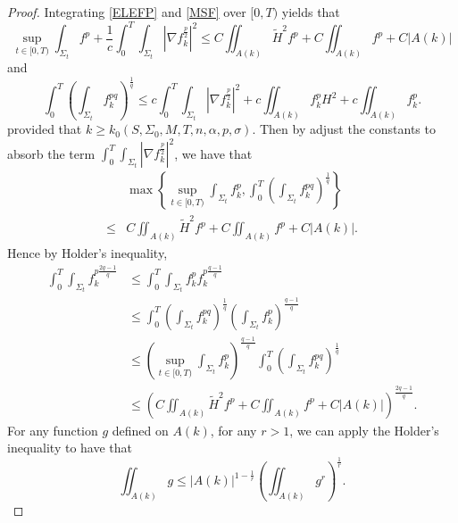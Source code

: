 \begin{proof}
    Integrating \autoref{ELEFP} and \autoref{MSF} over $[0,T)$ yields that 
    \begin{equation*}
        \sup _{t \in [0,T)} \int_{\Sigma_t} f^p + \frac{1}{c} \int_{0}^{T}\int_{\Sigma_t} \left| \nabla f_{k}^{\frac{p}{2}}  \right| ^2 \leq C \iint_{A(k)}^{} \tilde{H}^2 f^p +C \iint_{A(k)}^{}f^p + C \left| A(k) \right| 
    \end{equation*}
    and
    \begin{equation*}
        \int_{0}^{T} \left(\int_{\Sigma_t} f_{k}^{pq} \right) ^{\frac{1}{q}} \leq c \int_{0}^{T}\int_{\Sigma_t} \left| \nabla f_{k}^{\frac{p}{2}} \right| ^2 + c \iint_{A(k)} f_{k}^{p} H^2 + c \iint_{A(k)} f_{k}^{p}.
    \end{equation*}
    provided that $k \geq k_0(S,\Sigma _0,M,T,n,\alpha ,p,\sigma ).$ 
    Then by adjust the constants to absorb the term $\int_{0}^{T}\int_{\Sigma_t} \left| \nabla f_{k}^{\frac{p}{2}} \right| ^2$, we have that
    \begin{equation*}
    \begin{split}
        &\max \left\{ \sup _{t \in [0,T)} \int_{\Sigma_t} f_{k}^{p}, \int_{0}^{T} \left(\int_{\Sigma_t} f_{k}^{pq} \right) ^{\frac{1}{q}}  \right\} \\
        \leq &C \iint_{A(k)}^{} \tilde{H}^2 f^p +C \iint_{A(k)}^{}f^p + C \left| A(k) \right|. 
    \end{split}
    \end{equation*} 
    Hence by Holder's inequality,
    \begin{equation} \label{SIE}
    \begin{split}
        \int_{0}^{T} \int_{\Sigma_t} f_{k}^{p \frac{2q-1}{q}}  
    &\leq  \int_{0}^{T} \int_{\Sigma_t} f_{k}^{p} f_{k}^{p \frac{q-1}{q}}  \\
    & \leq \int_{0}^{T} \left( \int_{\Sigma_t} f_{k}^{pq}  \right) ^{\frac{1}{q}} \left( \int_{\Sigma_t} f_{k}^{p}  \right) ^{\frac{q-1}{q}}\\
    & \leq \left( \sup _{t \in [0,T)} \int_{\Sigma_t} f_{k}^{p} \right) ^{\frac{q-1}{q}}  \int_{0}^{T} \left(\int_{\Sigma_t} f_{k}^{pq} \right) ^{\frac{1}{q}} \\
    & \leq \left( C \iint_{A(k)}^{} \tilde{H}^2 f^p +C \iint_{A(k)}^{}f^p + C \left| A(k) \right| \right) ^{\frac{2q-1}{q}}.
    \end{split}
    \end{equation}
    For any function $g$ defined on $A(k)$, for any $r>1$, we can apply the Holder's inequality to have that \[\iint_{A(k)}^{}g \leq \left| A(k) \right| ^{1-\frac{1}{r}}\left( \iint_{A(k)}^{} g^r \right) ^{\frac{1}{r}}.\]

\end{proof}
